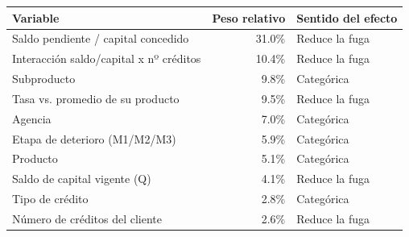 \begin{tabular}{@{}lrl@{}}
\toprule
\textbf{Variable} & \textbf{Peso relativo} & \textbf{Sentido del efecto} \\
\midrule
Saldo pendiente / capital concedido & 31.0\% & Reduce la fuga \\
Interacción saldo/capital x nº créditos & 10.4\% & Reduce la fuga \\
Subproducto & 9.8\% & Categórica \\
Tasa vs. promedio de su producto & 9.5\% & Reduce la fuga \\
Agencia & 7.0\% & Categórica \\
Etapa de deterioro (M1/M2/M3) & 5.9\% & Categórica \\
Producto & 5.1\% & Categórica \\
Saldo de capital vigente (Q) & 4.1\% & Reduce la fuga \\
Tipo de crédito & 2.8\% & Categórica \\
Número de créditos del cliente & 2.6\% & Reduce la fuga \\
\bottomrule
\end{tabular}